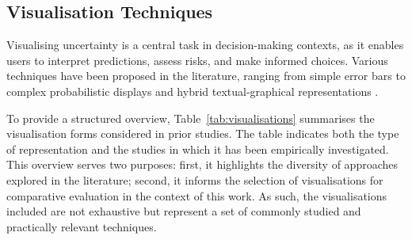 \documentclass[final,journal,a4paper]{IEEEtran}
\begin{document}
\subsection{Visualisation Techniques}
Visualising uncertainty is a central task in decision-making contexts, as it enables users to interpret predictions, assess risks, and make informed choices. Various techniques have been proposed in the literature, ranging from simple error bars to complex probabilistic displays and hybrid textual-graphical representations \cite{Kay2016, GrietheSchumann, Potter2012}.

To provide a structured overview, Table~\ref{tab:visualisations} summarises the visualisation forms considered in prior studies. The table indicates both the type of representation and the studies in which it has been empirically investigated. This overview serves two purposes: first, it highlights the diversity of approaches explored in the literature; second, it informs the selection of visualisations for comparative evaluation in the context of this work. As such, the visualisations included are not exhaustive but represent a set of commonly studied and practically relevant techniques.
\end{document}
